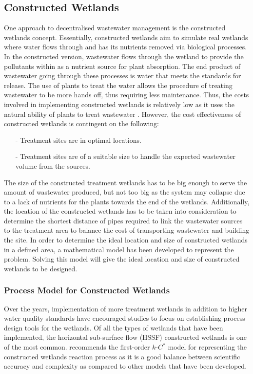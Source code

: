 \documentclass[preprint,12pt,authoryear]{elsarticle}
\begin{document}
\subsection{Constructed Wetlands}
One approach to decentralised wastewater management is the constructed wetlands concept. Essentially, constructed wetlands aim to simulate real wetlands where water flows through and has its nutrients removed via biological processes. In the constructed version, wastewater flows through the wetland to provide the pollutants within as a nutrient source for plant absorption. The end product of wastewater going through these processes is water that meets the standards for release. The use of plants to treat the water allows the procedure of treating wastewater to be more hands off, thus requiring less maintenance. Thus, the costs involved in implementing constructed wetlands is relatively low as it uses the natural ability of plants to treat wastewater \citep{kadlec2009,mawss2015}. However, the cost effectiveness of constructed wetlands is contingent on the following: 
\begin{itemize}
	\setlength{\itemsep}{0pt}
	\setlength{\parskip}{0pt}
	\setlength{\parsep}{0pt}
	\item[-] Treatment sites are in optimal locations. 
	\item[-] Treatment sites are of a suitable size to handle the expected wastewater volume from the sources. 
\end{itemize}
The size of the constructed treatment wetlands has to be big enough to serve the amount of wastewater produced, but not too big as the system may collapse due to a lack of nutrients for the plants towards the end of the wetlands. Additionally, the location of the constructed wetlands has to be taken into consideration to determine the shortest distance of pipes required to link the wastewater sources to the treatment area to balance the cost of transporting wastewater and building the site. \citep{mawss2015} In order to determine the ideal location and size of constructed wetlands in a defined area, a mathematical model has been developed to represent the problem. Solving this model will give the ideal location and size of constructed wetlands to be designed.

\subsubsection{Process Model for Constructed Wetlands}
Over the years, implementation of more treatment wetlands in addition to higher water quality standards have encouraged studies to focus on establishing process design tools for the wetlands. Of all the types of wetlands that have been implemented, the horizontal sub-surface flow (HSSF) constructed wetlands is one of the most common. \cite{rousseau2004model} recommends the first-order $k$-$C^*$ model for representing the constructed wetlands reaction process as it is a good balance between scientific accuracy and complexity as compared to other models that have been developed. 
\end{document}
